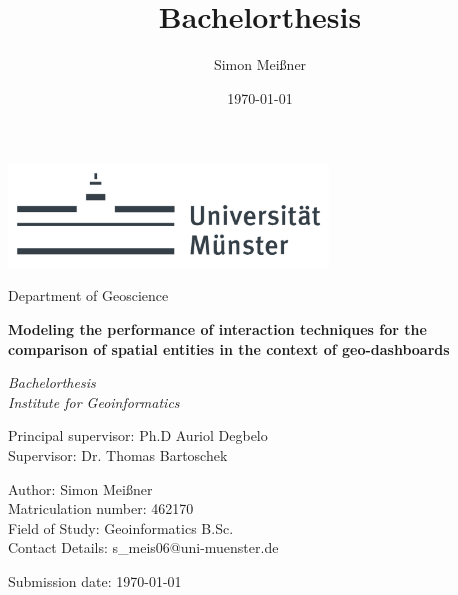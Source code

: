 \documentclass[fontsize=12pt,parskip=half,listof=totoc]{scrreprt}
\title{Bachelorthesis}
\author{Simon Meißner}
\date{\today}
\begin{document}
\begin{titlepage}
    \sffamily
    \begin{center}
        \includegraphics[width=8.5cm]{images/UniMuenster.png}
        \vspace{.5cm}
        
        {\large Department of Geoscience}
        \vspace{2cm}
        
        \begin{spacing}{1.5}
            {\Large \textbf{Modeling the performance of interaction techniques for
                            the comparison of spatial entities in the context of
                            geo-dashboards}}
            \vspace{.5cm}

            {\large \textit{Bachelorthesis\\Institute for Geoinformatics}}
        \end{spacing}
    \end{center}
    \vfill

    Principal supervisor:       \tabto{5cm} Ph.D Auriol Degbelo\\
    Supervisor:      \tabto{5cm} Dr. Thomas Bartoschek

    Author:         \tabto{5cm} Simon Meißner\\
    Matriculation number:   \tabto{5cm} 462170\\
    Field of Study: \tabto{5cm} Geoinformatics B.Sc.\\
    Contact Details: \tabto{5cm} s\_meis06@uni-muenster.de


    Submission date:        \tabto{5cm} \today
\end{titlepage}


\tableofcontents
\clearpage

\pagestyle{headings}












\end{document}
